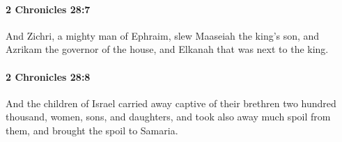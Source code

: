 		\paragraph{2 Chronicles 28:7} %
			\label{2CHRONICLES-28-7}

			And Zichri, a mighty man of Ephraim, slew Maaseiah the king's son, and Azrikam the governor of the house, and Elkanah that was next to the king.


		\paragraph{2 Chronicles 28:8} %
			\label{2CHRONICLES-28-8}

			And the children of Israel carried away captive of their brethren two hundred thousand, women, sons, and daughters, and took also away much spoil from them, and brought the spoil to Samaria.


